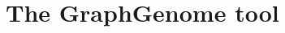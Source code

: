 \documentclass[thesis.tex]{subfiles}
\begin{document}
\chapter{The GraphGenome tool}
\label{sec:tool}
\end{document}
